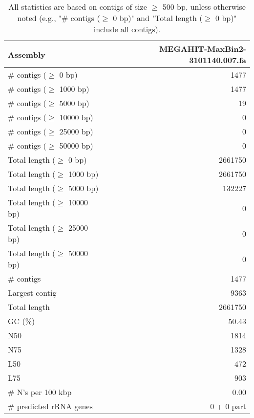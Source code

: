 \documentclass[12pt,a4paper]{article}
\begin{document}
\begin{table}[ht]
\begin{center}
\caption{All statistics are based on contigs of size $\geq$ 500 bp, unless otherwise noted (e.g., "\# contigs ($\geq$ 0 bp)" and "Total length ($\geq$ 0 bp)" include all contigs).}
\begin{tabular}{|l*{1}{|r}|}
\hline
Assembly & MEGAHIT-MaxBin2-3101140.007.fa \\ \hline
\# contigs ($\geq$ 0 bp) & 1477 \\ \hline
\# contigs ($\geq$ 1000 bp) & 1477 \\ \hline
\# contigs ($\geq$ 5000 bp) & 19 \\ \hline
\# contigs ($\geq$ 10000 bp) & 0 \\ \hline
\# contigs ($\geq$ 25000 bp) & 0 \\ \hline
\# contigs ($\geq$ 50000 bp) & 0 \\ \hline
Total length ($\geq$ 0 bp) & 2661750 \\ \hline
Total length ($\geq$ 1000 bp) & 2661750 \\ \hline
Total length ($\geq$ 5000 bp) & 132227 \\ \hline
Total length ($\geq$ 10000 bp) & 0 \\ \hline
Total length ($\geq$ 25000 bp) & 0 \\ \hline
Total length ($\geq$ 50000 bp) & 0 \\ \hline
\# contigs & 1477 \\ \hline
Largest contig & 9363 \\ \hline
Total length & 2661750 \\ \hline
GC (\%) & 50.43 \\ \hline
N50 & 1814 \\ \hline
N75 & 1328 \\ \hline
L50 & 472 \\ \hline
L75 & 903 \\ \hline
\# N's per 100 kbp & 0.00 \\ \hline
\# predicted rRNA genes & 0 + 0 part \\ \hline
\end{tabular}
\end{center}
\end{table}
\end{document}
